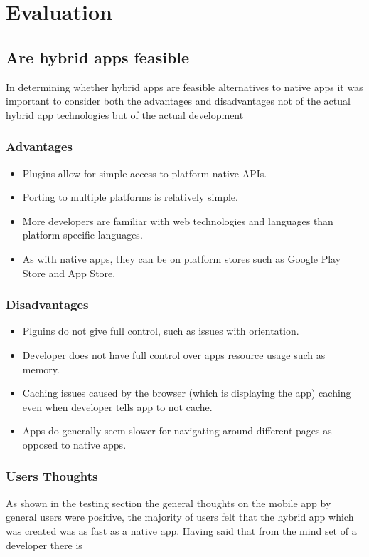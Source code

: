 \chapter{Evaluation}

\section{Are hybrid apps feasible}
In determining whether hybrid apps are feasible alternatives to native apps it was important to consider both the advantages and disadvantages not of the actual hybrid app technologies but of the actual development  

\subsection{Advantages}
\begin{itemize}
	\item Plugins allow for simple access to platform native APIs.
	\item Porting to multiple platforms is relatively simple.
	\item More developers are familiar with web technologies and languages than platform specific languages.
	\item As with native apps, they can be on platform stores such as Google Play Store and App Store.
\end{itemize}
\subsection{Disadvantages}
\begin{itemize}
    \item Plguins do not give full control, such as issues with orientation.
    \item Developer does not have full control over apps resource usage such as memory.
    \item Caching issues caused by the browser (which is displaying the app) caching even when developer tells app to not cache.
    \item Apps do generally seem slower for navigating around different pages as opposed to native apps. 
\end{itemize}
\subsection{Users Thoughts}
As shown in the testing section the general thoughts on the mobile app by general users were positive, the majority of users felt that the hybrid app which was created was as fast as a native app. Having said that from the mind set of a developer there is 
